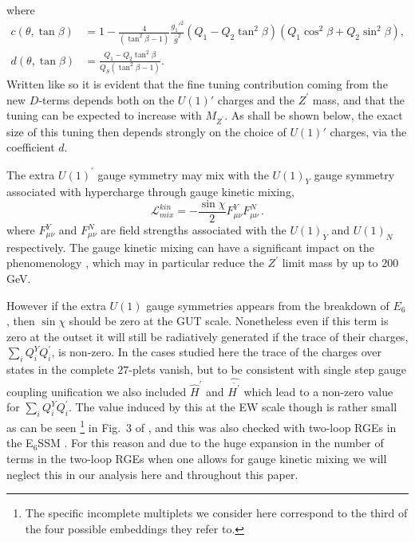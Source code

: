 \documentclass[preprint,amsmath,amssymb,aps,superscriptaddress,prd,
showpacs,floatfix,nofootinbib]{revtex4-1}
\newcommand{\be}{\begin{equation}}
\newcommand{\ee}{\end{equation}}
\begin{document}
where
\begin{align}
c(\theta , \tan\beta) &= 1 - \frac{4}{\left (\tan^2\beta - 1 \right )}
\frac{g_1'^2}{\bar{g}^2} \left (Q_1 - Q_2 \tan^2\beta \right )
\left (Q_1 \cos^2\beta + Q_2 \sin^2\beta \right ) , \label{eq:cdefn} \\
d(\theta , \tan\beta) &= \frac{Q_1 - Q_2 \tan^2\beta}
{Q_S \left (\tan^2\beta - 1\right )} . \label{eq:ddefn}
\end{align}
Written like so it is evident that the fine tuning contribution coming
from the new $D$-terms depends both on the $U(1)'$ charges and the
$Z^\prime$ mass, and that the tuning can be expected to increase with
$M_{Z^\prime}$.  As shall be shown below, the exact size of this tuning
then depends strongly on the choice of $U(1)'$ charges, via the
coefficient $d$.

The extra $U(1)^\prime$ gauge symmetry may mix with the $U(1)_Y$ gauge
symmetry associated with hypercharge through gauge kinetic mixing,
\be
\mathcal{L}_{mix}^{kin}=-\frac{\sin\chi}{2}F^{Y}_{\mu\nu}F^{N}_{\mu\nu}\,.
\label{Eq:GKM}
\ee
where $F_{\mu\nu}^Y$ and $F_{\mu\nu}^{N}$ are field strengths associated
with the $U(1)_Y$ and $U(1)_{N}$ respectively.  The gauge kinetic mixing
can have a significant impact on the phenomenology
\cite{Rizzo:1998ut,Salvioni:2009mt,Krauss:2012ku}, which may in particular
reduce the $Z^\prime$ limit mass by up to $200$ GeV.

However if the extra $U(1)$ gauge symmetries appears from the breakdown of
$E_6$, then $\sin\chi$ should be zero at the GUT scale.  Nonetheless even
if this term is zero at the outset it will still be radiatively generated
if the trace of their charges, $\sum_i Q_i^Y Q^\prime_i$, is non-zero.  In
the cases studied here the trace of the charges over states in the complete
$27$-plets vanish, but to be consistent with single step gauge coupling
unification we also included $\hat{H}^\prime$ and $\hat{\overline{H^\prime}}$
which lead to a non-zero value for $\sum_i Q_i^Y Q^\prime_i $.  The value
induced by this at the EW scale though is rather small as can be seen
\footnote{The specific incomplete multiplets we consider here correspond
to the third of the four possible embeddings they refer to.} in Fig.~3 of
\cite{Rizzo:1998ut}, and this was also checked with two-loop RGEs in the
E$_6$SSM \cite{King:2005jy,Athron:2009bs}.  For this reason and due to the
huge expansion in the number of terms in the two-loop RGEs when one allows
for gauge kinetic mixing we will neglect this in our analysis here and
throughout this paper.
\end{document}
